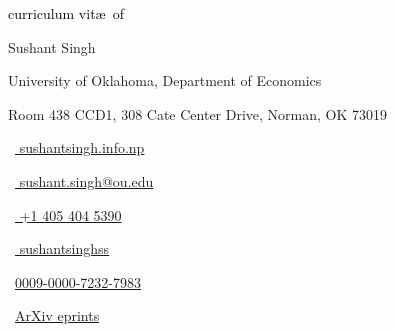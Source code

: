 \begin{scriptsize}
	 \textcolor{black}{curriculum vit\ae~of}
\end{scriptsize}

\vspace*{-0.10em}
\begin{Large} 
	Sushant Singh
\end{Large}

\vspace*{0.25em}
\begin{scshape}
	\begin{footnotesize}
		  \textcolor{highlight2}{University of Oklahoma, Department of Economics}
		  
		  \vspace*{-1ex}
		  \textcolor{highlight2}{Room 438 CCD1, 308 Cate Center Drive,
Norman, OK 73019}
	\end{footnotesize}
\end{scshape}
\vspace*{0.4cm}

\begin{footnotesize}
	\begin{tiny}\faHome\end{tiny}~\href{https://www.sushantsingh.info.np/}{
		sushantsingh.info.np
	}
	\quad \begin{tiny}\faEnvelope[regular]\end{tiny}~\href{mailto:sushant.singh@ou.edu}{%
		sushant.singh@ou.edu
		}
	\quad \begin{tiny}\faMobile*\end{tiny}~\href{tel:+14054045390}{%
		+1 405 404 5390
	} 	
		
	\quad 
	\begin{tiny}\faLinkedinIn\end{tiny}~\href{https://www.linkedin.com/in/sushantsinghss/}{
		sushantsinghss
	}
	\quad 
	\begin{tiny}\aiOrcid\end{tiny}~\href{https://orcid.org/0009-0000-7232-7983}{0009-0000-7232-7983}
\quad
\begin{tiny}\aiarXiv\end{tiny}~\href{https://arxiv.org/a/0009-0000-7232-7983.html}{ArXiv eprints}


	

\end{footnotesize}
